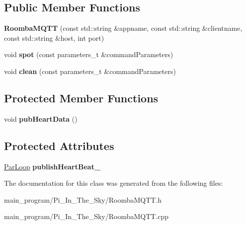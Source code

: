 \subsection*{Public Member Functions}
\begin{DoxyCompactItemize}
\item 
{\bfseries Roomba\+M\+Q\+TT} (const std\+::string \&appname, const std\+::string \&clientname, const std\+::string \&host, int port)\hypertarget{class_roomba_m_q_t_t_a20d5a60deabb9b8148a3cf0f1409dc71}{}\label{class_roomba_m_q_t_t_a20d5a60deabb9b8148a3cf0f1409dc71}

\item 
void {\bfseries spot} (const parameters\+\_\+t \&command\+Parameters)\hypertarget{class_roomba_m_q_t_t_a6f3742feb79a0743c5a79402b9bc9c1f}{}\label{class_roomba_m_q_t_t_a6f3742feb79a0743c5a79402b9bc9c1f}

\item 
void {\bfseries clean} (const parameters\+\_\+t \&command\+Parameters)\hypertarget{class_roomba_m_q_t_t_ae1db76fddfb7c1394bfaed552de1b21d}{}\label{class_roomba_m_q_t_t_ae1db76fddfb7c1394bfaed552de1b21d}

\end{DoxyCompactItemize}
\subsection*{Protected Member Functions}
\begin{DoxyCompactItemize}
\item 
void {\bfseries pub\+Heart\+Data} ()\hypertarget{class_roomba_m_q_t_t_af039bf156519a272d7770831894d0ac8}{}\label{class_roomba_m_q_t_t_af039bf156519a272d7770831894d0ac8}

\end{DoxyCompactItemize}
\subsection*{Protected Attributes}
\begin{DoxyCompactItemize}
\item 
\hyperlink{class_par_loop}{Par\+Loop} {\bfseries publish\+Heart\+Beat\+\_\+}\hypertarget{class_roomba_m_q_t_t_a87013e349743a9ebd7f403adf5a23703}{}\label{class_roomba_m_q_t_t_a87013e349743a9ebd7f403adf5a23703}

\end{DoxyCompactItemize}


The documentation for this class was generated from the following files\+:\begin{DoxyCompactItemize}
\item 
main\+\_\+program/\+Pi\+\_\+\+In\+\_\+\+The\+\_\+\+Sky/Roomba\+M\+Q\+T\+T.\+h\item 
main\+\_\+program/\+Pi\+\_\+\+In\+\_\+\+The\+\_\+\+Sky/Roomba\+M\+Q\+T\+T.\+cpp\end{DoxyCompactItemize}
